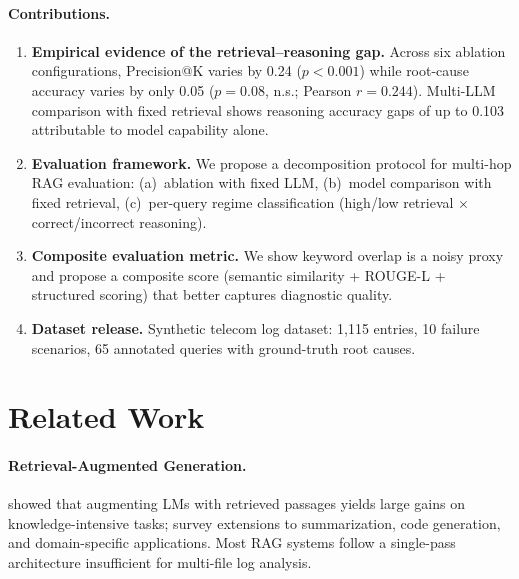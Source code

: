 \documentclass[11pt,a4paper]{article}
\begin{document}
\paragraph{Contributions.}
\begin{enumerate}[nosep]
    \item \textbf{Empirical evidence of the retrieval--reasoning gap.}
    Across six ablation configurations, Precision@K varies by 0.24
    ($p{<}0.001$) while root-cause accuracy varies by only 0.05
    ($p{=}0.08$, n.s.; Pearson $r{=}0.244$).
    Multi-LLM comparison with fixed retrieval shows reasoning
    accuracy gaps of up to 0.103 attributable to model capability
    alone.
    \item \textbf{Evaluation framework.}
    We propose a decomposition protocol for multi-hop RAG evaluation:
    (a)~ablation with fixed LLM, (b)~model comparison with fixed
    retrieval, (c)~per-query regime classification (high/low
    retrieval $\times$ correct/incorrect reasoning).
    \item \textbf{Composite evaluation metric.}
    We show keyword overlap is a noisy proxy and propose a composite
    score (semantic similarity + ROUGE-L + structured scoring) that
    better captures diagnostic quality.
    \item \textbf{Dataset release.}
    Synthetic telecom log dataset: 1{,}115 entries, 10 failure
    scenarios, 65 annotated queries with ground-truth root causes.
\end{enumerate}


\section{Related Work}
\label{sec:related}

\paragraph{Retrieval-Augmented Generation.}
\citet{lewis2020rag} showed that augmenting LMs with retrieved
passages yields large gains on knowledge-intensive tasks;
\citet{gao2023ragsurvey} survey extensions to summarization, code
generation, and domain-specific applications.
Most RAG systems follow a single-pass architecture insufficient for
multi-file log analysis.
\end{document}
